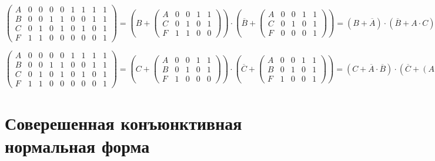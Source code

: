 \documentclass[a4paper,10pt]{article} %
\begin{document}
	\begin{equation}
		\left(
		\begin{smallmatrix}
			A & 0 & 0 & 0 & 0 & 1 & 1 & 1 & 1 \\
			B & 0 & 0 & 1 & 1 & 0 & 0 & 1 & 1 \\
			C & 0 & 1 & 0 & 1 & 0 & 1 & 0 & 1 \\
			F & 1 & 1 & 0 & 0 & 0 & 0 & 0 & 1
		\end{smallmatrix}
		\right)
		= \left(B + 
		\left(
		\begin{smallmatrix}
			A & 0 & 0 & 1 & 1 \\
			C & 0 & 1 & 0 & 1 \\
			F & 1 & 1 & 0 & 0
		\end{smallmatrix}
		\right)
		\right) \cdot \left(\overline{B} + 
		\left(
		\begin{smallmatrix}
			A & 0 & 0 & 1 & 1 \\
			C & 0 & 1 & 0 & 1 \\
			F & 0 & 0 & 0 & 1
		\end{smallmatrix}  
		\right)
		\right) = (B + \overline{A}) \cdot (\overline{B} + A \cdot C)
	\end{equation}
	
	\begin{equation}
		\left(
		\begin{smallmatrix}
			A & 0 & 0 & 0 & 0 & 1 & 1 & 1 & 1 \\
			B & 0 & 0 & 1 & 1 & 0 & 0 & 1 & 1 \\
			C & 0 & 1 & 0 & 1 & 0 & 1 & 0 & 1 \\
			F & 1 & 1 & 0 & 0 & 0 & 0 & 0 & 1
		\end{smallmatrix}
		\right)
		= \left( C + 
		\left(
		\begin{smallmatrix}
			A & 0 & 0 & 1 & 1 \\
			B & 0 & 1 & 0 & 1 \\
			F & 1 & 0 & 0 & 0
		\end{smallmatrix}
		\right)
		\right) \cdot \left( \overline{C} +
		\left(
		\begin{smallmatrix}
			A & 0 & 0 & 1 & 1 \\
			B & 0 & 1 & 0 & 1 \\
			F & 1 & 0 & 0 & 1 
		\end{smallmatrix}
		\right)
		\right) = (C + \overline{A} \cdot \overline{B}) \cdot
		 (\overline{C} + (A \equiv B)) 
	\end{equation}

	\section{Соверешенная конъюнктивная нормальная форма}
	
\end{document}
